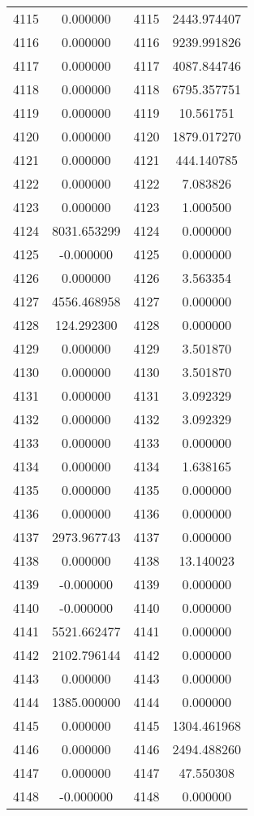 \documentclass[12pt]{article}
\begin{document}
\begin{longtable}{@{}cccc@{}}
4115 & 0.000000 & 4115 & 2443.974407 \\
4116 & 0.000000 & 4116 & 9239.991826 \\
4117 & 0.000000 & 4117 & 4087.844746 \\
4118 & 0.000000 & 4118 & 6795.357751 \\
4119 & 0.000000 & 4119 & 10.561751 \\
4120 & 0.000000 & 4120 & 1879.017270 \\
4121 & 0.000000 & 4121 & 444.140785 \\
4122 & 0.000000 & 4122 & 7.083826 \\
4123 & 0.000000 & 4123 & 1.000500 \\
4124 & 8031.653299 & 4124 & 0.000000 \\
4125 & -0.000000 & 4125 & 0.000000 \\
4126 & 0.000000 & 4126 & 3.563354 \\
4127 & 4556.468958 & 4127 & 0.000000 \\
4128 & 124.292300 & 4128 & 0.000000 \\
4129 & 0.000000 & 4129 & 3.501870 \\
4130 & 0.000000 & 4130 & 3.501870 \\
4131 & 0.000000 & 4131 & 3.092329 \\
4132 & 0.000000 & 4132 & 3.092329 \\
4133 & 0.000000 & 4133 & 0.000000 \\
4134 & 0.000000 & 4134 & 1.638165 \\
4135 & 0.000000 & 4135 & 0.000000 \\
4136 & 0.000000 & 4136 & 0.000000 \\
4137 & 2973.967743 & 4137 & 0.000000 \\
4138 & 0.000000 & 4138 & 13.140023 \\
4139 & -0.000000 & 4139 & 0.000000 \\
4140 & -0.000000 & 4140 & 0.000000 \\
4141 & 5521.662477 & 4141 & 0.000000 \\
4142 & 2102.796144 & 4142 & 0.000000 \\
4143 & 0.000000 & 4143 & 0.000000 \\
4144 & 1385.000000 & 4144 & 0.000000 \\
4145 & 0.000000 & 4145 & 1304.461968 \\
4146 & 0.000000 & 4146 & 2494.488260 \\
4147 & 0.000000 & 4147 & 47.550308 \\
4148 & -0.000000 & 4148 & 0.000000 \\

\end{longtable}
\end{document}
